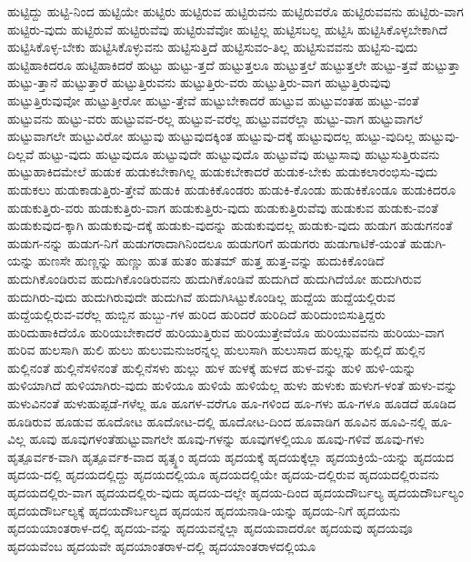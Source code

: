 {ಹುಟ್ಟಿದ್ದು
ಹುಟ್ಟಿ-ನಿಂದ
ಹುಟ್ಟಿಯೇ
ಹುಟ್ಟಿರು
ಹುಟ್ಟಿರುವ
ಹುಟ್ಟಿರುವನು
ಹುಟ್ಟಿರುವರೊ
ಹುಟ್ಟಿರುವವನು
ಹುಟ್ಟಿರು-ವಾಗ
ಹುಟ್ಟಿರು-ವುದು
ಹುಟ್ಟಿರುವೆ
ಹುಟ್ಟಿರುವೆವು
ಹುಟ್ಟಿರುವೆವೋ
ಹುಟ್ಟಿಲ್ಲ
ಹುಟ್ಟಿಸಬಲ್ಲ
ಹುಟ್ಟಿಸಿ
ಹುಟ್ಟಿಸಿಕೊಳ್ಳಬೇಕಾಗಿದೆ
ಹುಟ್ಟಿಸಿಕೊಳ್ಳ-ಬೇಕು
ಹುಟ್ಟಿಸಿಕೊಳ್ಳುವನು
ಹುಟ್ಟಿಸುತ್ತಿದೆ
ಹುಟ್ಟಿಸುವಂ-ತಿಲ್ಲ
ಹುಟ್ಟಿಸುವವನು
ಹುಟ್ಟಿಸು-ವುದು
ಹುಟ್ಟಿಹಾಕಿದರೂ
ಹುಟ್ಟಿಹಾಕಿದರೆ
ಹುಟ್ಟು
ಹುಟ್ಟು-ತ್ತದೆ
ಹುಟ್ಟುತ್ತಲೂ
ಹುಟ್ಟುತ್ತಲೆ
ಹುಟ್ಟುತ್ತಲೇ
ಹುಟ್ಟು-ತ್ತವೆ
ಹುಟ್ಟುತ್ತಾ
ಹುಟ್ಟು-ತ್ತಾನೆ
ಹುಟ್ಟುತ್ತಾರೆ
ಹುಟ್ಟುತ್ತಿರುವನು
ಹುಟ್ಟುತ್ತಿರು-ವರು
ಹುಟ್ಟುತ್ತಿರು-ವಾಗ
ಹುಟ್ಟುತ್ತಿರುವುವು
ಹುಟ್ಟುತ್ತಿರುವುವೋ
ಹುಟ್ಟುತ್ತೀರೋ
ಹುಟ್ಟು-ತ್ತೇವೆ
ಹುಟ್ಟುಬೇಕಾದರೆ
ಹುಟ್ಟುವ
ಹುಟ್ಟುವಂತಹ
ಹುಟ್ಟು-ವಂತೆ
ಹುಟ್ಟುವನು
ಹುಟ್ಟು-ವರು
ಹುಟ್ಟುವವ-ರಲ್ಲ
ಹುಟ್ಟುವ-ವರೆಲ್ಲ
ಹುಟ್ಟುವವರೆಲ್ಲಾ
ಹುಟ್ಟು-ವಾಗ
ಹುಟ್ಟುವಾಗಲೆ
ಹುಟ್ಟುವಾಗಲೇ
ಹುಟ್ಟುವಿರೋ
ಹುಟ್ಟುವು
ಹುಟ್ಟುವುದಕ್ಕಿಂತ
ಹುಟ್ಟುವು-ದಕ್ಕೆ
ಹುಟ್ಟುವುದಲ್ಲ
ಹುಟ್ಟು-ವುದಿಲ್ಲ
ಹುಟ್ಟುವು-ದಿಲ್ಲವೆ
ಹುಟ್ಟು-ವುದು
ಹುಟ್ಟುವುದೂ
ಹುಟ್ಟುವುದೇ
ಹುಟ್ಟುವುದೊ
ಹುಟ್ಟುವೆವು
ಹುಟ್ಟುಸಾವು
ಹುಟ್ಟುಸುತ್ತಿರುವನು
ಹುಟ್ಟುಹಾಕಿದಮೇಲೆ
ಹುಡುಕ
ಹುಡುಕಬೇಕಾಗಿಲ್ಲ
ಹುಡುಕಬೇಕಾದರೆ
ಹುಡುಕ-ಬೇಕು
ಹುಡುಕಲಾರಂಭಿಸು-ವುದು
ಹುಡುಕಲು
ಹುಡುಕಾಡುತ್ತಿರು-ತ್ತೇವೆ
ಹುಡುಕಿ
ಹುಡುಕಿಕೊಂಡರು
ಹುಡುಕಿ-ಕೊಂಡು
ಹುಡುಕಿಕೊಂಡೂ
ಹುಡುಕಿದರೂ
ಹುಡುಕುತ್ತಿರು-ವರು
ಹುಡುಕುತ್ತಿರು-ವಾಗ
ಹುಡುಕುತ್ತಿರು-ವುದು
ಹುಡುಕುತ್ತಿರುವೆವು
ಹುಡುಕುವ
ಹುಡುಕು-ವಂತೆ
ಹುಡುಕುವುದ-ಕ್ಕಾಗಿ
ಹುಡುಕುವು-ದಕ್ಕೆ
ಹುಡುಕು-ವುದನ್ನು
ಹುಡುಕುವುದಲ್ಲ
ಹುಡುಕು-ವುದು
ಹುಡುಗ
ಹುಡುಗನಂತೆ
ಹುಡುಗ-ನನ್ನು
ಹುಡುಗ-ನಿಗೆ
ಹುಡುಗರಾದಾಗಿನಿಂದಲೂ
ಹುಡುಗರಿಗೆ
ಹುಡುಗರು
ಹುಡುಗಾಟಿಕೆ-ಯಂತೆ
ಹುಡುಗಿ-ಯನ್ನು
ಹುಣಸೇ
ಹುಣ್ಣನ್ನು
ಹುಣ್ಣು
ಹುತ
ಹುತಂ
ಹುತಮ್
ಹುತ್ತ
ಹುತ್ತ-ವನ್ನು
ಹುದುಕಿಕೊಂಡಿದೆ
ಹುದುಗಿಕೊಂಡಿರುವ
ಹುದುಗಿಕೊಂಡಿರುವನು
ಹುದುಗಿಕೊಂಡಿವೆ
ಹುದುಗಿದೆ
ಹುದುಗಿದೆಯೋ
ಹುದುಗಿರುವ
ಹುದುಗಿರು-ವುದು
ಹುದುಗಿರುವುದೇ
ಹುದುಗಿವೆ
ಹುದುಗಿಸಿಟ್ಟುಕೊಂಡಿಲ್ಲ
ಹುದ್ದೆಯ
ಹುದ್ದೆಯಲ್ಲಿರುವ
ಹುದ್ದೆಯಲ್ಲಿರುವ-ವರೆಲ್ಲ
ಹುಬ್ಬಿನ
ಹುಬ್ಬು-ಗಳ
ಹುರಿದ
ಹುರಿದರೆ
ಹುರಿದಿದೆ
ಹುರಿದುಂಬಿಸುತ್ತಿದ್ದರು
ಹುರಿದುಹಾಕಿದೆಯೊ
ಹುರಿಯಬೇಕಾದರೆ
ಹುರಿಯುತ್ತಿರುವ
ಹುರಿಯುತ್ತೇವೆಯೊ
ಹುರಿಯುವವನು
ಹುರಿಯು-ವಾಗ
ಹುರಿವ
ಹುಲಸಾಗಿ
ಹುಲಿ
ಹುಲು
ಹುಲುಮನುಜರನ್ನಲ್ಲ
ಹುಲುಸಾಗಿ
ಹುಲುಸಾದ
ಹುಲ್ಲನ್ನು
ಹುಲ್ಲಿದೆ
ಹುಲ್ಲಿನ
ಹುಲ್ಲಿನಂತೆ
ಹುಲ್ಲಿನೆಸಳಿನಂತೆ
ಹುಲ್ಲಿನೆಸಳು
ಹುಲ್ಲು
ಹುಳ
ಹುಳಕ್ಕೆ
ಹುಳದ
ಹುಳ-ವನ್ನು
ಹುಳಿ
ಹುಳಿ-ಯನ್ನು
ಹುಳಿಯಾಗಿದೆ
ಹುಳಿಯಾಗಿರು-ವುದು
ಹುಳಿಯೂ
ಹುಳಿಯೆ
ಹುಳಿಯೆಲ್ಲ
ಹುಳು
ಹುಳುಕು
ಹುಳುಗ-ಳಂತೆ
ಹುಳು-ವನ್ನು
ಹುಳುವಿನಂತೆ
ಹುಳುಹುಪ್ಪಡೆ-ಗಳೆಲ್ಲ
ಹೂ
ಹೂಗಳ-ವರೆಗೂ
ಹೂ-ಗಳಿಂದ
ಹೂ-ಗಳು
ಹೂ-ಗಳೂ
ಹೂಡದೆ
ಹೂಡಿದ
ಹೂಡಿರುವ
ಹೂಡುವ
ಹೂದೋಟ
ಹೂದೋಟ-ದಲ್ಲಿ
ಹೂದೋಟ-ದಿಂದ
ಹೂವಾಡಿಗ
ಹೂವಿನ
ಹೂವಿ-ನಲ್ಲಿ
ಹೂ-ವಿಲ್ಲ
ಹೂವು
ಹೂವುಗಳಂತೆಹುಟ್ಟುವಾಗಲೇ
ಹೂವು-ಗಳನ್ನು
ಹೂವುಗಳಲ್ಲಿಯೂ
ಹೂವು-ಗಳಿವೆ
ಹೂವು-ಗಳು
ಹೃತ್ಪೂರ್ವಕ-ವಾಗಿ
ಹೃತ್ಪೂರ್ವಕ-ವಾದ
ಹೃತ್ಸ್ಥಂ
ಹೃದಯ
ಹೃದಯಕ್ಕೆ
ಹೃದಯಕ್ಕೆಲ್ಲಾ
ಹೃದಯಕ್ರಿಯೆ-ಯನ್ನು
ಹೃದಯದ
ಹೃದಯ-ದಲ್ಲಿ
ಹೃದಯದಲ್ಲಿದ್ದು
ಹೃದಯದಲ್ಲಿಯೂ
ಹೃದಯದಲ್ಲಿಯೇ
ಹೃದಯ-ದಲ್ಲಿರುವ
ಹೃದಯದಲ್ಲಿರುವನು
ಹೃದಯದಲ್ಲಿರು-ವಾಗ
ಹೃದಯದಲ್ಲಿರು-ವುದು
ಹೃದಯ-ದಲ್ಲೇ
ಹೃದಯ-ದಿಂದ
ಹೃದಯದೌರ್ಬಲ್ಯ
ಹೃದಯದೌರ್ಬಲ್ಯಂ
ಹೃದಯದೌರ್ಬಲ್ಯಕ್ಕೆ
ಹೃದಯದೌರ್ಬಲ್ಯದ
ಹೃದಯನ
ಹೃದಯನಾಡಿ-ಯನ್ನು
ಹೃದಯ-ನಿಗೆ
ಹೃದಯನು
ಹೃದಯಯಾಂತರಾಳ-ದಲ್ಲಿ
ಹೃದಯ-ವನ್ನು
ಹೃದಯವನ್ನೆಲ್ಲಾ
ಹೃದಯವಾದರೋ
ಹೃದಯವು
ಹೃದಯವೂ
ಹೃದಯವೆಂಬ
ಹೃದಯವೇ
ಹೃದಯಾಂತರಾಳ-ದಲ್ಲಿ
ಹೃದಯಾಂತರಾಳದಲ್ಲಿಯೂ
}
